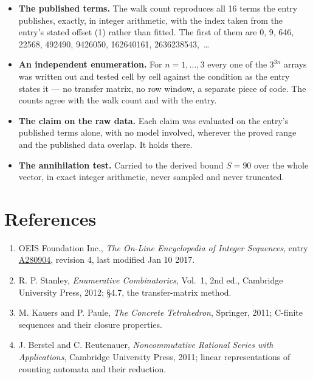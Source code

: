 \documentclass[11pt]{article}
\theoremstyle{definition}
\begin{document}
\begin{itemize}

\item {\bfseries The published terms.} The walk count reproduces all 16 terms the entry publishes, exactly, in integer arithmetic, with the index taken from the entry's stated offset (1) rather than fitted. The first of them are 0, 9, 646, 22568, 492490, 9426050, 162640161, 2636238543,~\dots

\item {\bfseries An independent enumeration.} For $n = 1,\dots,3$ every one of the $3^{3n}$ arrays was written out and tested cell by cell against the condition as the entry states it --- no transfer matrix, no row window, a separate piece of code. The counts agree with the walk count and with the entry.

\item {\bfseries The claim on the raw data.} Each claim was evaluated on the entry's published terms alone, with no model involved, wherever the proved range and the published data overlap. It holds there.

\item {\bfseries The annihilation test.} Carried to the derived bound $S = 90$ over the whole vector, in exact integer arithmetic, never sampled and never truncated.

\end{itemize}

\section{References}

\begin{enumerate}

\item OEIS Foundation Inc., \emph{The On-Line Encyclopedia of Integer Sequences}, entry \href{https://oeis.org/A280904}{A280904}, revision 4, last modified Jan 10 2017.

\item R. P. Stanley, \emph{Enumerative Combinatorics}, Vol.~1, 2nd ed., Cambridge University Press, 2012; \S4.7, the transfer-matrix method.

\item M. Kauers and P. Paule, \emph{The Concrete Tetrahedron}, Springer, 2011; C-finite sequences and their closure properties.

\item J. Berstel and C. Reutenauer, \emph{Noncommutative Rational Series with Applications}, Cambridge University Press, 2011; linear representations of counting automata and their reduction.

\end{enumerate}
\end{document}
